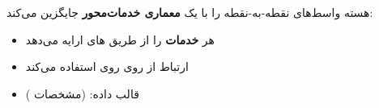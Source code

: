 

\CNchained{}

هسته  واسط‌های نقطه-به-نقطه را با یک \textbf{معماری خدمات‌محور } جایگزین می‌کند:

\begin{itemize}
\tightlist
\item
  هر  \textbf{خدمات} را از طریق های  ارایه می‌دهد
\item
  ارتباط از  روی  روی  استفاده می‌کند
\item
  قالب داده:  (مشخصات )
\end{itemize}



